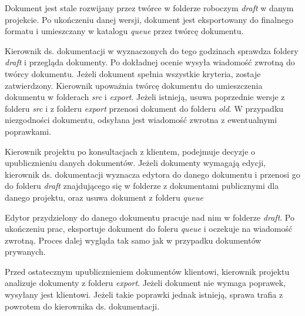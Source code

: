 \documentclass{article}
\begin{document}
Dokument jest stale rozwijany przez twórce w folderze roboczym \textit{draft} w danym projekcie. Po ukończeniu
danej wersji, dokument jest eksportowany do finalnego formatu i umieszczany w katalogu \textit{queue} przez twórcę dokumentu.
\par
Kierownik ds. dokumentacji w wyznaczonych do tego godzinach sprawdza foldery \textit{draft}
i przegląda dokumenty. Po dokładnej ocenie wysyła wiadomość zwrotną do twórcy
dokumentu. Jeżeli dokument spełnia wszystkie kryteria, zostaje zatwierdzony. Kierownik
upoważnia twórcę dokumentu do umieszczenia dokumentu w folderach \textit{src} i \textit{export}.
Jeżeli istnieją, usuwa poprzednie wersje z folderu \textit{src} i z folderu \textit{export} przenosi
dokument do folderu \textit{old}. W przypadku niezgodności dokumentu, odsyłana
jest wiadomość zwrotna z ewentualnymi poprawkami.
\par
Kierownik projektu po konsultacjach z klientem, podejmuje decyzje o upublicznieniu
danych dokumentów. Jeżeli dokumenty wymagają edycji, kierownik ds. dokumentacji
wyznacza edytora do danego dokumentu i przenosi go do folderu \textit{draft} znajdującego
się w folderze z dokumentami publicznymi dla danego projektu, oraz usuwa dokument z folderu \textit{queue}
\par
Edytor przydzielony do danego dokumentu pracuje nad nim w folderze \textit{draft}.
Po ukończeniu prac, eksportuje dokument do foleru \textit{queue} i oczekuje na
wiadomość zwrotną. Proces dalej wygląda tak samo jak w przypadku dokumentów prywanych.
\par
Przed ostatecznym upublicznieniem dokumentów klientowi, kierownik projektu
analizuje dokumenty z folderu \textit{export}. Jeżeli dokument nie wymaga 
poprawek, wysyłany jest klientowi. Jeżeli takie poprawki jednak istnieją, sprawa
trafia z powrotem do kierownika ds. dokumentacji.
\end{document}
